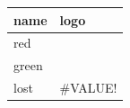 \documentclass[11pt,a4paper]{article}
\begin{document}
\begin{table}[h]
\begin{tabular}{|l|l|}
\hline
name & logo \\ \hline
red & %
 \\ \hline
green & %
 \\ \hline
lost & \#VALUE! \\ \hline
\end{tabular}
\end{table}
\end{document}
